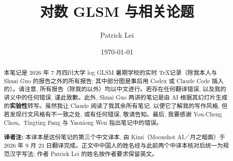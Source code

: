 \documentclass{amsart}
\title{对数 GLSM 与相关论题}
\author{Patrick Lei}
\date{\today}
\theoremstyle{definition}
\theoremstyle{remark}
\theoremstyle{plain}
\theoremstyle{definition}
\theoremstyle{remark}
\newcommand{\1}{\mathbf{1}}
\newcommand{\2}{\mathbf{2}}
\newcommand{\3}{\mathbf{3}}
\begin{document}
    
\begin{abstract}
    本笔记是 2026 年 7 月四川大学 log GLSM 暑期学校的实时 \TeX 记录（除我本人与 Shuai Guo 的报告之外的所有报告; 其中部分图是事后用 Codex 或 Claude Code 插入的）。请注意, 所有报告（除我的以外）均以中文进行。若存在任何翻译错误, 以及我的讲义中的任何错误, 谨此致歉。此外, Shuai Guo 两讲的笔记是由 AI 根据其幻灯片生成的\textbf{实验性}转写。虽然我让 Claude 阅读了我其余所有笔记, 以便它了解我的写作风格, 但若发现行文风格有不一致之处, 或有任何错误, 敬请告知。最后, 我要感谢 You-Cheng Chou、Tingting Fang 与 Yaoxiong Wen 指出笔记中的错误。

    \medskip
    \noindent\textbf{译者注: }本译本是这份笔记的第三个中文译本, 由 Kimi（Moonshot AI／月之暗面）于 2026 年 9 月 23 日翻译完成。正文中中国人的姓名经与此前两个中译本核对后统一为规范汉字写法; 作者 Patrick Lei 的姓名按作者要求保留英文。
\end{abstract}

\maketitle

\tableofcontents
\end{document}
